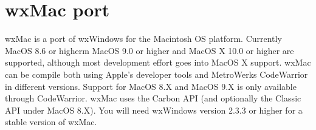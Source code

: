 \section{wxMac port}\label{wxmacport}

wxMac is a port of wxWindows for the Macintosh OS platform.
Currently MacOS 8.6 or higherm MacOS 9.0 or higher and
MacOS X 10.0 or higher are supported, although most development
effort goes into MacOS X support. wxMac can be compile both
using Apple's developer tools and MetroWerks CodeWarrior in
different versions. Support for MacOS 8.X and MacOS 9.X is
only available through CodeWarrior. wxMac uses the Carbon
API (and optionally the Classic API under MacOS 8.X). You
will need wxWindows version 2.3.3 or higher for a stable
version of wxMac.

